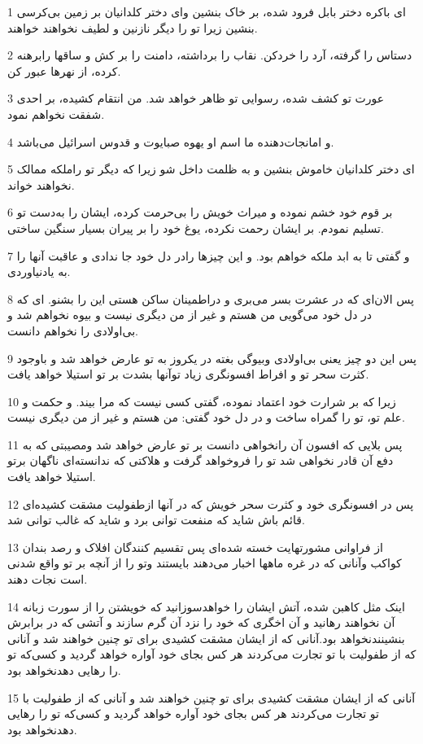 \par 1 ای باکره دختر بابل فرود شده، بر خاک بنشین و‌ای دختر کلدانیان بر زمین بی‌کرسی بنشین زیرا تو را دیگر نازنین و لطیف نخواهند خواهند.
\par 2 دستاس را گرفته، آرد را خردکن. نقاب را برداشته، دامنت را بر کش و ساقها رابرهنه کرده، از نهرها عبور کن.
\par 3 عورت تو کشف شده، رسوایی تو ظاهر خواهد شد. من انتقام کشیده، بر احدی شفقت نخواهم نمود.
\par 4 و امانجات‌دهنده ما اسم او یهوه صبایوت و قدوس اسرائیل می‌باشد.
\par 5 ‌ای دختر کلدانیان خاموش بنشین و به ظلمت داخل شو زیرا که دیگر تو راملکه ممالک نخواهند خواند.
\par 6 بر قوم خود خشم نموده و میراث خویش را بی‌حرمت کرده، ایشان را به‌دست تو تسلیم نمودم. بر ایشان رحمت نکرده، یوغ خود را بر پیران بسیار سنگین ساختی.
\par 7 و گفتی تا به ابد ملکه خواهم بود. و این چیزها رادر دل خود جا ندادی و عاقبت آنها را به یادنیاوردی.
\par 8 پس الان‌ای که در عشرت بسر می‌بری و دراطمینان ساکن هستی این را بشنو. ای که در دل خود می‌گویی من هستم و غیر از من دیگری نیست و بیوه نخواهم شد و بی‌اولادی را نخواهم دانست.
\par 9 پس این دو چیز یعنی بی‌اولادی وبیوگی بغته در یکروز به تو عارض خواهد شد و باوجود کثرت سحر تو و افراط افسونگری زیاد توآنها بشدت بر تو استیلا خواهد یافت.
\par 10 زیرا که بر شرارت خود اعتماد نموده، گفتی کسی نیست که مرا بیند. و حکمت و علم تو، تو را گمراه ساخت و در دل خود گفتی: من هستم و غیر از من دیگری نیست.
\par 11 پس بلایی که افسون آن رانخواهی دانست بر تو عارض خواهد شد ومصیبتی که به دفع آن قادر نخواهی شد تو را فروخواهد گرفت و هلاکتی که ندانسته‌ای ناگهان برتو استیلا خواهد یافت.
\par 12 پس در افسونگری خود و کثرت سحر خویش که در آنها ازطفولیت مشقت کشیده‌ای قائم باش شاید که منفعت توانی برد و شاید که غالب توانی شد.
\par 13 از فراوانی مشورتهایت خسته شده‌ای پس تقسیم کنندگان افلاک و رصد بندان کواکب وآنانی که در غره ماهها اخبار می‌دهند بایستند وتو را از آنچه بر تو واقع شدنی است نجات دهند.
\par 14 اینک مثل کاهبن شده، آتش ایشان را خواهدسوزانید که خویشتن را از سورت زبانه آن نخواهند رهانید و آن اخگری که خود را نزد آن گرم سازند و آتشی که در برابرش بنشینندنخواهد بود.آنانی که از ایشان مشقت کشیدی برای تو چنین خواهند شد و آنانی که از طفولیت با تو تجارت می‌کردند هر کس بجای خود آواره خواهد گردید و کسی‌که تو را رهایی دهدنخواهد بود.
\par 15 آنانی که از ایشان مشقت کشیدی برای تو چنین خواهند شد و آنانی که از طفولیت با تو تجارت می‌کردند هر کس بجای خود آواره خواهد گردید و کسی‌که تو را رهایی دهدنخواهد بود.
 
